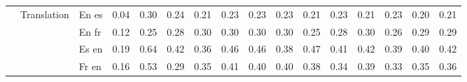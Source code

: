 \begin{center}
\begin{longtable}{lllrrrrrrrrrrrrr}
\cline{2-16}
 & \multirow[t]{4}{*}{Translation} & En es & 0.04 & 0.30 & 0.24 & 0.21 & 0.23 & 0.23 & 0.23 & 0.21 & 0.23 & 0.21 & 0.23 & 0.20 & 0.21 \\
 &  & En fr & 0.12 & 0.25 & 0.28 & 0.30 & 0.30 & 0.30 & 0.30 & 0.25 & 0.28 & 0.30 & 0.26 & 0.29 & 0.29 \\
 &  & Es en & 0.19 & 0.64 & 0.42 & 0.36 & 0.46 & 0.46 & 0.38 & 0.47 & 0.41 & 0.42 & 0.39 & 0.40 & 0.42 \\
 &  & Fr en & 0.16 & 0.53 & 0.29 & 0.35 & 0.41 & 0.40 & 0.40 & 0.38 & 0.34 & 0.39 & 0.33 & 0.35 & 0.36 \\
\cline{1-16} \cline{2-16}
\bottomrule
\end{longtable}

\end{center}
\twocolumn